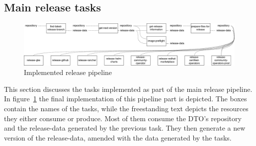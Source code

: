 \subsection{Main release tasks}\label{subsec:main-release-tasks}

\begin{figure}[H]
    \centering
    \includegraphics[width=\textwidth]{img/implementation/release-pipeline.drawio}
    \caption{Implemented release pipeline}
    \label{fig:implemented-release-pipeline}
\end{figure}

This section discusses the tasks implemented as part of the main release pipeline.
In figure~\ref{fig:implemented-release-pipeline} the final implementation of this pipeline part is depicted.
The boxes contain the names of the tasks, while the freestanding text depicts the resources they either consume or produce.
Most of them consume the DTO's repository and the release-data generated by the previous task.
They then generate a new version of the release-data, amended with the data generated by the tasks.



\pagebreak



\pagebreak




















